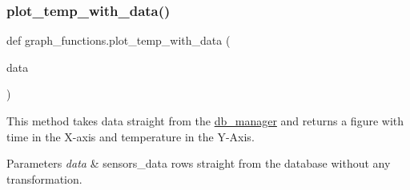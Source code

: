 \subsubsection{\texorpdfstring{plot\+\_\+temp\+\_\+with\+\_\+data()}{plot\_temp\_with\_data()}}
{\footnotesize\ttfamily def graph\+\_\+functions.\+plot\+\_\+temp\+\_\+with\+\_\+data (\begin{DoxyParamCaption}\item[{}]{data }\end{DoxyParamCaption})}



This method takes data straight from the \textquotesingle{}\hyperlink{namespacedb__manager}{db\+\_\+manager}\textquotesingle{} and returns a figure with time in the X-\/axis and temperature in the Y-\/\+Axis. 


\begin{DoxyParams}{Parameters}
{\em data} & \textquotesingle{}sensors\+\_\+data\textquotesingle{} rows straight from the database without any transformation. \\
\hline
\end{DoxyParams}
